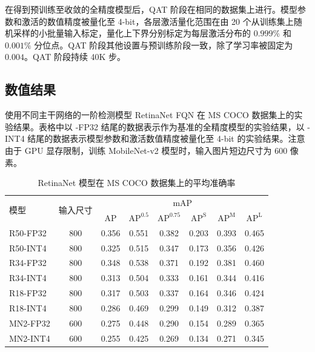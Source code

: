 \documentclass[
  fontset = mac,
]{shtthesis}
\begin{document}
在得到预训练至收敛的全精度模型后，QAT 阶段在相同的数据集上进行。模型参数和激活的数值精度被量化至 4-bit，各层激活量化范围在由 20 个从训练集上随机采样的小批量输入标定，量化上下界分别标定为每层激活分布的 $0.999\%$ 和 $0.001\%$ 分位点。QAT 阶段其他设置与预训练阶段一致，除了学习率被固定为 $0.004$。QAT 阶段持续 40K 步。
\subsection{数值结果} \label{sec::fqn::main_exp}

\begin{table}[p]
  \centering
  \caption{使用不同主干网络的一阶检测模型 RetinaNet FQN 在 MS COCO 数据集上的实验结果。表格中以 -FP32 结尾的数据表示作为基准的全精度模型的实验结果，以 -INT4 结尾的数据表示模型参数和激活数值精度被量化至 4-bit 的实验结果。注意由于 GPU 显存限制，训练 MobileNet-v2 模型时，输入图片短边尺寸为 600 像素。}
  \label{tab::fqn::retina_coco}
  \begin{subtable}[t]{\columnwidth}
    \centering
    \caption{RetinaNet 模型在 MS COCO 数据集上的平均准确率}
    \label{tab::fqn::retina_coco_mAP}
    \begin{tabular}{lc*{6}{c}}
      \toprule
      \multirow{2}{*}{模型} & \multirow{2}{*}{输入尺寸} & \multicolumn{6}{c}{mAP}  \\
      & & $\mathrm{AP}$ & $\mathrm{AP}^{0.5}$ & $\mathrm{AP}^{0.75}$ &
      $\mathrm{AP} ^ {\mathrm{S}}$ & $\mathrm{AP} ^ {\mathrm{M}}$ & $\mathrm{AP} ^ {\mathrm{L}}$ \\
      \midrule
      R50-FP32 & 800 & 0.356 &0.551 &0.382 &0.203 &0.393 &0.465 \\
      R50-INT4 & 800 & 0.325 &0.515 &0.347 &0.173 &0.356 &0.426 \\
      \hdashline
      R34-FP32 & 800 & 0.348 &0.538 &0.371 &0.192 &0.381 &0.460 \\
      R34-INT4 & 800 & 0.313 &0.504 &0.333 &0.161 &0.344 &0.416 \\
      \hdashline
      R18-FP32 & 800 & 0.317 &0.503 &0.337 &0.164 &0.346 &0.424 \\
      R18-INT4 & 800 & 0.286 &0.469 &0.299 &0.149 &0.312 &0.387 \\
      \hdashline
      MN2-FP32 & 600 & 0.275 &0.448 &0.290 &0.154 &0.289 &0.365 \\
      MN2-INT4 & 600 & 0.255 &0.425 &0.269 &0.134 &0.271 &0.345 \\

\end{tabular}
\end{subtable}
\end{table}
\end{document}
